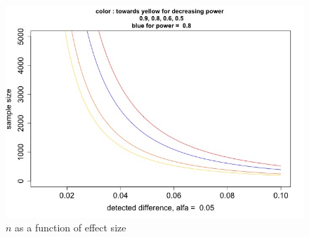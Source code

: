 \documentclass[14pt]{article}
\begin{document}
\begin{figure}[h!]
\begin{minipage}{0.31\textwidth}
\end{minipage}
\begin{minipage}{0.31\textwidth}
  \centering
\includegraphics[scale=0.23]{plots/plot_samplesize VS effectsize_alfa_beta 3.jpg}  
\end{minipage}
\caption{$n$ as a function of effect size}
\label{fig:sample size alpha}
\end{figure}


 
\end{document}
